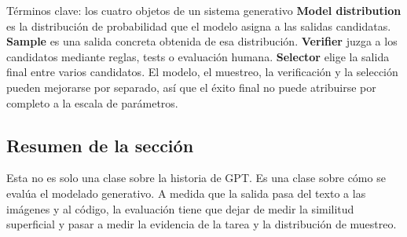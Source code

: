 \begin{knowledgebox}{Términos clave: los cuatro objetos de un sistema generativo}
\textbf{Model distribution} es la distribución de probabilidad que el modelo asigna a las salidas candidatas. \textbf{Sample} es una salida concreta obtenida de esa distribución. \textbf{Verifier} juzga a los candidatos mediante reglas, tests o evaluación humana. \textbf{Selector} elige la salida final entre varios candidatos. El modelo, el muestreo, la verificación y la selección pueden mejorarse por separado, así que el éxito final no puede atribuirse por completo a la escala de parámetros.
\end{knowledgebox}

\subsection{Resumen de la sección}

Esta no es solo una clase sobre la historia de GPT. Es una clase sobre cómo se evalúa el modelado generativo. A medida que la salida pasa del texto a las imágenes y al código, la evaluación tiene que dejar de medir la similitud superficial y pasar a medir la evidencia de la tarea y la distribución de muestreo.

